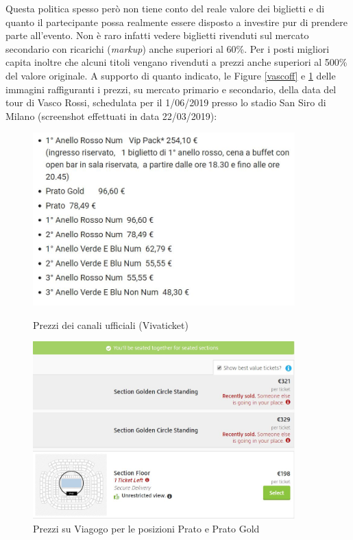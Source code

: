 Questa politica spesso però non tiene conto del reale valore dei biglietti e di quanto il partecipante possa realmente essere disposto a investire pur di prendere parte all'evento. Non è raro infatti vedere biglietti rivenduti sul mercato secondario con ricarichi (\textit{markup}) anche superiori al 60\%. Per i posti migliori capita inoltre che alcuni titoli vengano rivenduti a prezzi anche superiori al 500\% del valore originale. A supporto di quanto indicato, le Figure \ref{vascoff} e \ref{vascovgg} delle immagini raffiguranti i prezzi, su mercato primario e secondario, della data del tour di Vasco Rossi, schedulata per il 1/06/2019 presso lo stadio San Siro di Milano (screenshot effettuati in data 22/03/2019): 
\begin{figure}[H]
    \centering
    \begin{minipage}{0.45\textwidth}
        \centering
        \includegraphics[width=0.9\textwidth]{chapter2/immagini/vascofv} %
        \caption{Prezzi dei canali ufficiali (Vivaticket)}
				\label{vascoff}
    \end{minipage}\hfill
    \begin{minipage}{0.45\textwidth}
        \centering
        \includegraphics[width=0.9\textwidth]{chapter2/immagini/vascost} %
        \caption{Prezzi su Viagogo per le posizioni Prato e Prato Gold}
				\label{vascovgg}
    \end{minipage}
\end{figure}

